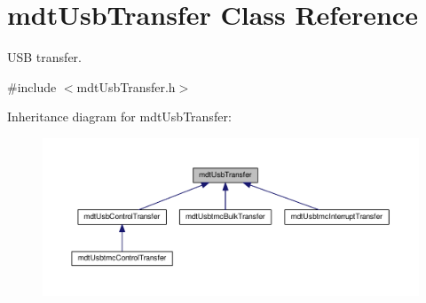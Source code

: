 \hypertarget{classmdt_usb_transfer}{\section{mdt\-Usb\-Transfer Class Reference}
\label{classmdt_usb_transfer}
}


U\-S\-B transfer.  




{\ttfamily \#include $<$mdt\-Usb\-Transfer.\-h$>$}



Inheritance diagram for mdt\-Usb\-Transfer\-:\nopagebreak
\begin{figure}[H]
\begin{center}
\leavevmode
\includegraphics[width=350pt]{classmdt_usb_transfer__inherit__graph}
\end{center}
\end{figure}
